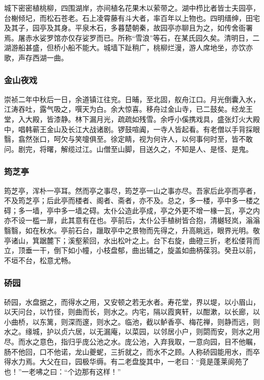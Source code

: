 \documentclass[]{article}
\begin{document}
城下密密植桃柳，四围湖岸，亦间植名花果木以萦带之。湖中栉比者皆士夫园亭，台榭倾圮，而松石苍老。石上凌霄藤有斗大者，率百年以上物也。四明缙绅，田宅及其子，园亭及其身。平泉木石，多暮楚朝秦，故园亭亦聊且为之，如传舍衙署焉。屠赤水娑罗馆亦仅存娑罗而已。所称``雪浪''等石，在某氏园久矣。清明日，二湖游船甚盛，但桥小船不能大。城墙下趾稍广，桃柳烂漫，游人席地坐，亦饮亦歌，声存西湖一曲。

\hypertarget{header-n46}{%
\subsubsection{金山夜戏}\label{header-n46}}

崇祯二年中秋后一日，余道镇江往兖。日晡，至北固，舣舟江口。月光倒囊入水，江涛吞吐，露气吸之，噀天为白。余大惊喜。移舟过金山寺，已二鼓矣。经龙王堂，入大殿，皆漆静。林下漏月光，疏疏如残雪。余呼小傒携戏具，盛张灯火大殿中，唱韩蕲王金山及长江大战诸剧。锣鼓喧阗，一寺人皆起看。有老僧以手背採眼翳，翕然张口，呵欠与笑嚏俱至。徐定睛，视为何许人，以何事何时至，皆不敢问。剧完，将曙，解缆过江。山僧至山脚，目送久之，不知是人、是怪、是鬼。

\hypertarget{header-n51}{%
\subsubsection{筠芝亭}\label{header-n51}}

筠芝亭，浑朴一亭耳。然而亭之事尽，筠芝亭一山之事亦尽。吾家后此亭而亭者，不及筠芝亭；后此亭而楼者、阁者、斋者，亦不及。总之，多一楼，亭中多一楼之碍；多一墙，亭中多一墙之碍。太仆公造此亭成，亭之外更不增一椽一瓦，亭之内亦不设一槛一扉，此其意有在也。亭前后，太仆公手植树皆合抱，清樾轻岚，滃滃翳翳，如在秋水。亭前石台，躐取亭中之景物而先得之，升高眺远，眼界光明。敬亭诸山，箕踞麓下；溪壑萦回，水出松叶之上。台下右旋，曲磴三折，老松偻背而立，顶垂一干，倒下如小幢，小枝盘郁，曲出辅之，旋盖如曲柄葆羽。癸丑以前，不垣不台，松意尤畅。

\hypertarget{header-n56}{%
\subsubsection{硚园}\label{header-n56}}

硚园，水盘据之，而得水之用，又安顿之若无水者。寿花堂，界以堤，以小眉山，以天问台，以竹径，则曲而长，则水之。内宅，隔以霞爽轩，以酣漱，以长廊，以小曲桥，以东篱，则深而邃，则水之。临池，截以鲈香亭、梅花禅，则静而远，则水之。缘城，护以贞六居，以无漏庵，以菜园，以邻居小户，则閟而安，则水之用尽。而水之意色，指归乎庞公池之水。庞公池，入弃我取，一意向园，目不他瞩，肠不他回，口不他诺，龙山夔蚭，三折就之，而水不之顾。人称硚园能用水，而卒得水力焉。大父在曰，园极华缛。有二老盘旋其中，一老曰：``竟是蓬莱阆苑了也！''一老咈之曰：``个边那有这样！''
\end{document}
